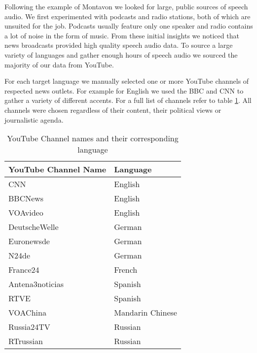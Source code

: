 	Following the example of Montavon \cite{montavon2009deep} we looked for large, public sources of speech audio. We first experimented with podcasts and radio stations, both of which are unsuited for the job. Podcasts usually feature only one speaker and radio contains a lot of noise in the form of music. From these initial insights we noticed that news broadcasts provided high quality speech audio data. To source a large variety of languages and gather enough hours of speech audio we sourced the majority of our data from YouTube. 
	
	For each target language we manually selected one or more YouTube channels of respected news outlets. For example for English we used the BBC and CNN to gather a variety of different accents. For a full list of channels refer to table \ref{tab:channels}. All channels were chosen regardless of their content, their political views or journalistic agenda.
	
	\begin{table}[]
	\centering
	\begin{tabularx}{\textwidth}{ll}
	\toprule
	YouTube Channel Name  & Language \\ \midrule
	CNN                   & English \\
	BBCNews               & English \\
	VOAvideo              & English \\
	DeutscheWelle         & German \\
	Euronewsde            & German \\
	N24de                 & German \\
	France24              & French \\
	Antena3noticias       & Spanish \\
	RTVE                  & Spanish \\
	VOAChina              & Mandarin Chinese  \\
	Russia24TV            & Russian \\
	RTrussian             & Russian \\ \bottomrule
	\end{tabularx}
	\caption{YouTube Channel names and their corresponding language}
	\label{tab:channels}
	\end{table}

